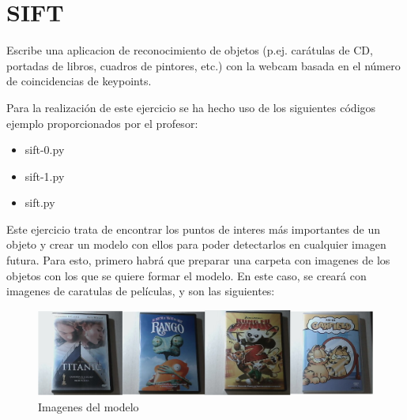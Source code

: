 \documentclass[a4paper]{article} %
\begin{document}
\newpage


\section{SIFT}
\bigskip

\begin{tcolorbox}[breakable,notitle,boxrule=0pt,colback=lightgray,colframe=lightgray]
Escribe una aplicacion de reconocimiento de objetos (p.ej. carátulas de CD, portadas de libros, cuadros de pintores, etc.) con la webcam basada en el número de coincidencias de keypoints.
\end{tcolorbox}

Para la realización de este ejercicio se ha hecho uso de los siguientes códigos ejemplo proporcionados por el profesor:

\begin{itemize}
  \item sift-0.py
  \item sift-1.py
  \item sift.py
\end{itemize}

Este ejercicio trata de encontrar los puntos de interes más importantes de un objeto y crear un modelo con ellos para poder detectarlos en cualquier imagen futura. Para esto, primero habrá que preparar una carpeta con imagenes de los objetos con los que se quiere formar el modelo. En este caso, se creará con imagenes de caratulas de películas, y son las siguientes:
\\

\begin{figure}[htp]
    \centering
    \includegraphics[width=15cm]{imagenes/modelo.png}
    \caption{Imagenes del modelo}
    \label{fig:modelo}
\end{figure}
\end{document}
